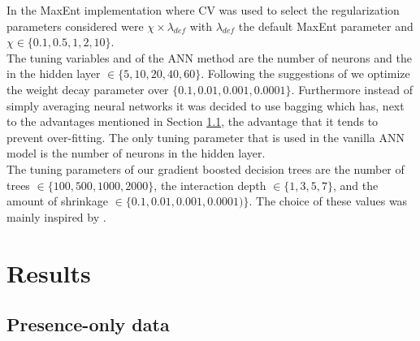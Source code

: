 In the MaxEnt implementation where CV was used to select the regularization parameters considered were $\chi \times \lambda_{def}$ with $\lambda_{def}$ the default MaxEnt parameter and $\chi \in \{0.1,0.5,1,2,10\}$. \\

The tuning variables and of the ANN method are the number of neurons and the in the hidden layer $\in \{ 5,10,20,40,60 \}$. Following the suggestions of \cite{venables_modern_2002} we optimize the weight decay parameter over $\{0.1,0.01,0.001,0.0001\}$. Furthermore instead of simply averaging neural networks it was decided to use bagging which has, next to the advantages mentioned in Section \ref{}, the advantage that it tends to prevent over-fitting. The only tuning parameter that is used in the vanilla ANN model is the number of neurons in the hidden layer. \\

The tuning parameters of our gradient boosted decision trees are the number of trees $\in \{ 100,500,1000,2000\}$, the interaction depth $\in \{ 1,3,5,7\}$, and the amount of shrinkage $\in  \{0.1,0.01,0.001,0.0001)\}$. The choice of these values was mainly inspired by \cite{elith_working_2008}. \\



\section{Results}
\subsection{Presence-only data}

